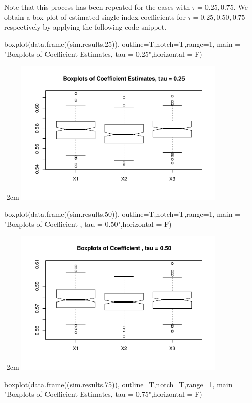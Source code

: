 Note that this process has been repeated for the cases with $\tau = 0.25, 0.75$. We obtain a box plot of estimated single-index coefficients for $\tau = 0.25, 0.50, 0.75$ respectively by applying the following code snippet. 

\begin{Schunk}
\begin{Sinput}
 boxplot(data.frame((sim.results.25)), outline=T,notch=T,range=1,
 main = "Boxplots of Coefficient Estimates, tau = 0.25",horizontal = F)
\end{Sinput}


\centering
\addtolength{\leftskip} {-2cm}
\addtolength{\rightskip}{-2cm}
\includegraphics[width=10cm]{siqr_files/figure-latex/unnamed-chunk-7-1}

\begin{Sinput}
 boxplot(data.frame((sim.results.50)), outline=T,notch=T,range=1,
 main = "Boxplots of Coefficient , tau = 0.50",horizontal = F)
\end{Sinput}


\centering
\addtolength{\leftskip} {-2cm}
\addtolength{\rightskip}{-2cm}
\includegraphics[width=10cm]{siqr_files/figure-latex/unnamed-chunk-8-1}

\begin{Sinput}
 boxplot(data.frame((sim.results.75)), outline=T,notch=T,range=1,
 main = "Boxplots of Coefficient Estimates, tau = 0.75",horizontal = F)
\end{Sinput}


\end{Schunk}
